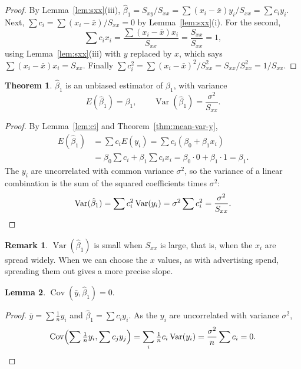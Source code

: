 \documentclass[11pt,a4paper]{article}
\numberwithin{equation}{section}
\theoremstyle{definition}
\newtheorem{thm}{Theorem}[subsection]
\newtheorem{lem}[thm]{Lemma}
\newtheorem*{remark}{Remark}
\begin{document}
\begin{proof}
By Lemma~\ref{lem:sxx}(iii), $\hat\beta_1 = S_{xy}/S_{xx} = \sum (x_i - \bar x) y_i / S_{xx} = \sum c_i y_i$.
Next, $\sum c_i = \sum (x_i - \bar x)/S_{xx} = 0$ by Lemma~\ref{lem:sxx}(i). For the second,
\[
\sum c_i x_i = \frac{\sum (x_i - \bar x) x_i}{S_{xx}} = \frac{S_{xx}}{S_{xx}} = 1 ,
\]
using Lemma~\ref{lem:sxx}(iii) with $y$ replaced by $x$, which says
$\sum (x_i - \bar x) x_i = S_{xx}$. Finally
$\sum c_i^2 = \sum (x_i - \bar x)^2 / S_{xx}^2 = S_{xx}/S_{xx}^2 = 1/S_{xx}$.
\end{proof}

\begin{thm}\label{thm:b1}
$\hat\beta_1$ is an unbiased estimator of $\beta_1$, with variance
\[
E(\hat\beta_1) = \beta_1, \qquad \operatorname{Var}(\hat\beta_1) = \frac{\sigma^2}{S_{xx}} .
\]
\end{thm}

\begin{proof}
By Lemma~\ref{lem:ci} and Theorem~\ref{thm:mean-var-y},
\begin{align*}
E(\hat\beta_1) &= \sum c_i E(y_i) = \sum c_i (\beta_0 + \beta_1 x_i) \\
  &= \beta_0 \sum c_i + \beta_1 \sum c_i x_i = \beta_0 \cdot 0 + \beta_1 \cdot 1 = \beta_1 .
\end{align*}
The $y_i$ are uncorrelated with common variance $\sigma^2$, so the variance of a linear
combination is the sum of the squared coefficients times $\sigma^2$:
\[
\operatorname{Var}(\hat\beta_1) = \sum c_i^2 \operatorname{Var}(y_i) = \sigma^2 \sum c_i^2 = \frac{\sigma^2}{S_{xx}} . \qedhere
\]
\end{proof}

\begin{remark}
$\operatorname{Var}(\hat\beta_1)$ is small when $S_{xx}$ is large, that is, when the $x_i$
are spread widely. When we can choose the $x$ values, as with advertising spend, spreading
them out gives a more precise slope.
\end{remark}

\begin{lem}\label{lem:cov-ybar}
$\operatorname{Cov}(\bar y, \hat\beta_1) = 0$.
\end{lem}

\begin{proof}
$\bar y = \sum \frac1n y_i$ and $\hat\beta_1 = \sum c_i y_i$. As the $y_i$ are uncorrelated
with variance $\sigma^2$,
\[
\operatorname{Cov}\Bigl(\sum \tfrac1n y_i, \sum c_j y_j\Bigr)
= \sum_i \tfrac1n c_i \operatorname{Var}(y_i) = \frac{\sigma^2}{n} \sum c_i = 0 . \qedhere
\]
\end{proof}
\end{document}
